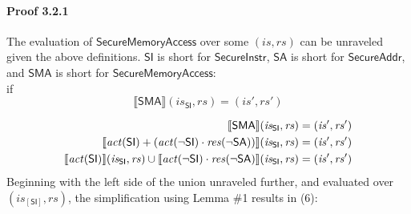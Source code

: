 \documentclass[12pt, letterpaper]{article}
\newcommand\interp[1]{\llbracket #1 \rrbracket}
\begin{document}
 \paragraph{Proof 3.2.1}
     The evaluation of $\mathsf{SecureMemoryAccess}$ over some $(\mathit{is},\mathit{rs})$ can be unraveled given the above definitions.  $\mathsf{SI}$ is short for $\mathsf{SecureInstr}$, $\mathsf{SA}$ is short for $\mathsf{SecureAddr}$, and $\mathsf{SMA}$ is short for $\mathsf{SecureMemoryAccess}$:\\
     if
     \[
     \interp{ \mathsf{SMA} } (\mathit{is_{\mathsf{SI}}}, \mathit{rs})
     =
     (\mathit{is}', \mathit{rs}')
     \]
 \par\nobreak
 {\fontsize{10pt}{12pt}\selectfont
 \begin{align}
     \setcounter{equation}{0}
     \label{3.2.1:step1}
     \interp{ \mathsf{SMA} } (\mathit{is_{\mathsf{SI}}}, \mathit{rs})
     &=
     (\mathit{is}', \mathit{rs}')
     \\
     \interp{ \mathit{act}(\mathsf{SI}) +
     (\mathit{act}(\neg\mathsf{SI}) \cdot
      \mathit{res}(\neg\mathsf{SA})) } (\mathit{is_{\mathsf{SI}}}, \mathit{rs})
     &=
     (\mathit{is}', \mathit{rs}')
     \\
     \interp{ \mathit{act}(\mathsf{SI}) } (\mathit{is_{\mathsf{SI}}}, \mathit{rs}) \cup %
     \interp{ \mathit{act}(\neg\mathsf{SI}) \cdot
      \mathit{res}(\neg\mathsf{SA}) } (\mathit{is_{\mathsf{SI}}}, \mathit{rs})
     &=
     (\mathit{is}', \mathit{rs}')
 \end{align}
 }%
     Beginning with the left side of the union unraveled further, and evaluated over $(\mathit{is}_{[\mathsf{SI}]},\mathit{rs})$, the simplification using Lemma \#1 results in (6):
\end{document}
